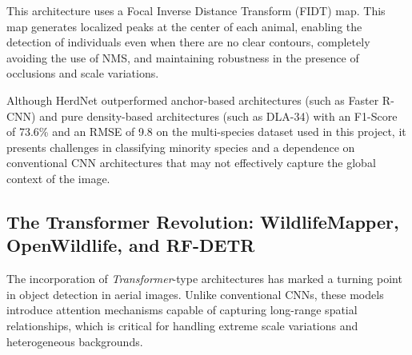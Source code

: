 This architecture uses a Focal Inverse Distance Transform (FIDT) map. This map generates localized peaks at the center of each animal, enabling the detection of individuals even when there are no clear contours, completely avoiding the use of NMS, and maintaining robustness in the presence of occlusions and scale variations.

Although HerdNet outperformed anchor-based architectures (such as Faster R-CNN) and pure density-based architectures (such as DLA-34) with an F1-Score of 73.6\% and an RMSE of 9.8 on the multi-species dataset used in this project, it presents challenges in classifying minority species and a dependence on conventional CNN architectures that may not effectively capture the global context of the image.

\subsection{The Transformer Revolution: WildlifeMapper, OpenWildlife, and RF-DETR}

The incorporation of \textit{Transformer}-type architectures has marked a turning point in object detection in aerial images. Unlike conventional CNNs, these models introduce attention mechanisms capable of capturing long-range spatial relationships, which is critical for handling extreme scale variations and heterogeneous backgrounds.

